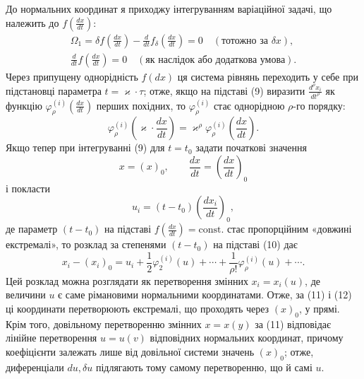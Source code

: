 \documentclass[11pt]{article}
\begin{document}
До нормальних координат я приходжу інтегруванням варіаційної задачі, що належить до \(f\!\left(\frac{dx}{dt}\right)\):
\begin{equation}
\begin{gathered}
\Omega_1=\delta f\!\left(\frac{dx}{dt}\right)
-\frac{d}{dt}f_\delta\!\left(\frac{dx}{dt}\right)=0
\quad(\text{тотожно за }\delta x),\\
\frac{d}{dt}f\!\left(\frac{dx}{dt}\right)=0
\quad(\text{як наслідок або додаткова умова}).
\end{gathered}
\tag{9}
\end{equation}
Через припущену однорідність \(f(dx)\) ця система рівнянь переходить у себе при підстановці параметра \(t=\varkappa\cdot\tau\); отже, якщо на підставі (9) виразити \(\frac{d^\rho x_i}{dt^\rho}\) як функцію \(\varphi_\rho^{(i)}\!\left(\frac{dx}{dt}\right)\) перших похідних, то \(\varphi_\rho^{(i)}\) стає однорідною \(\rho\)-го порядку:
\begin{equation}
\varphi_\rho^{(i)}\!\left(\varkappa\cdot\frac{dx}{dt}\right)
=\varkappa^\rho\varphi_\rho^{(i)}\!\left(\frac{dx}{dt}\right).
\tag{10}
\end{equation}
Якщо тепер при інтегруванні (9) для \(t=t_0\) задати початкові значення
\[
x=(x)_0,\qquad \frac{dx}{dt}=\left(\frac{dx}{dt}\right)_0
\]
і покласти
\begin{equation}
u_i=(t-t_0)\left(\frac{dx_i}{dt}\right)_0,
\tag{11}
\end{equation}
де параметр \((t-t_0)\) на підставі \(f\!\left(\frac{dx}{dt}\right)=\mathrm{const.}\) стає пропорційним «довжині екстремалі», то розклад за степенями \((t-t_0)\) на підставі (10) дає
\begin{equation}
x_i-(x_i)_0=u_i+\frac12\varphi_2^{(i)}(u)+\cdots+
\frac{1}{\rho!}\varphi_\rho^{(i)}(u)+\cdots .
\tag{12}
\end{equation}
Цей розклад можна розглядати як перетворення змінних \(x_i=x_i(u)\), де величини \(u\) є саме рімановими нормальними координатами. Отже, за (11) і (12) ці координати перетворюють екстремалі, що проходять через \((x)_0\), у прямі. Крім того, довільному перетворенню змінних \(x=x(y)\) за (11) відповідає лінійне перетворення \(u=u(v)\) відповідних нормальних координат, причому коефіцієнти залежать лише від довільної системи значень \((x)_0\); отже, диференціали \(du,\delta u\) підлягають тому самому перетворенню, що й самі \(u\).
\end{document}
